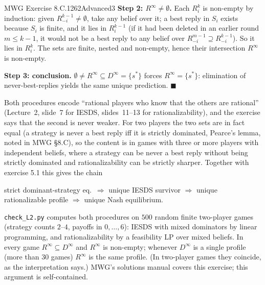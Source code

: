 \begin{exsol}{MWG Exercise 8.C.1}{262}{Advanced}{3}
\textbf{Step 2: $R^\infty \ne \emptyset$.} Each $R^k_i$ is non-empty by induction: given $R^{k-1}_{-i} \ne
\emptyset$, take any belief over it; a best reply in $S_i$ exists because $S_i$ is finite, and it
lies in $R^{k-1}_i$ (if it had been deleted in an earlier round $m \le k-1$, it would not be a best reply
to any belief over $R^{m-1}_{-i} \supseteq R^{k-1}_{-i}$). So it lies in $R^k_i$. The sets are finite,
nested and non-empty, hence their intersection $R^\infty$ is non-empty.

\textbf{Step 3: conclusion.} $\emptyset \ne R^\infty \subseteq D^\infty = \{s^*\}$ forces
$R^\infty = \{s^*\}$: elimination of never-best-replies yields the same unique prediction. $\blacksquare$


\interp Both procedures encode ``rational players who know that the others are rational''
(Lecture~2, slide~7 for IESDS, slides~11--13 for rationalizability), and the exercise says that the
second is never weaker. For two players the two sets are in fact equal (a strategy is never a
best reply iff it is strictly dominated, Pearce's lemma, noted in MWG \S8.C), so the content is
in games with three or more players with independent beliefs, where a strategy can be never a best reply
without being strictly dominated and rationalizability can be strictly sharper. Together with
exercise 5.1 this gives the chain
\begin{center}\small
strict dominant-strategy eq.\ $\Rightarrow$ unique IESDS survivor $\Rightarrow$
unique rationalizable profile $\Rightarrow$ unique Nash equilibrium.
\end{center}

\verify \texttt{check\_L2.py} computes both procedures on $500$ random finite two-player games (strategy
counts $2$--$4$, payoffs in $0,\dots,6$): IESDS with mixed dominators by linear programming, and
rationalizability by a feasibility LP over mixed beliefs. In every game $R^\infty \subseteq D^\infty$ and
$R^\infty$ is non-empty; whenever $D^\infty$ is a single profile (more than $30$ games) $R^\infty$ is the same
profile. (In two-player games they coincide, as the interpretation says.) MWG's solutions manual covers
this exercise; this argument is self-contained.


\end{exsol}
